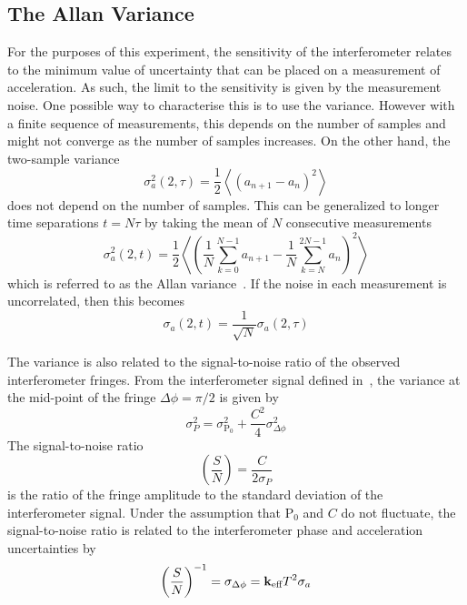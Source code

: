 \subsection{The Allan Variance}\label{subsec:allan_variance}
For the purposes of this experiment, the sensitivity of the
interferometer relates to the minimum value of uncertainty that can be
placed on a measurement of acceleration. As such, the limit to the
sensitivity is given by the measurement noise. One possible way to
characterise this is to use the variance. However with a finite sequence
of measurements, this depends on the number of samples and might not
converge as the number of samples increases. On the other hand, the
two-sample variance 
\begin{equation}
  \sigma_a^2(2,\tau) = \frac{1}{2}\left\langle
  (a_{n+1}-a_n)^2\right\rangle
  \label{eq:two_sample_var}
\end{equation}
does not depend on the number of samples. This can be generalized to
longer time separations \(t = N \tau\) by taking the mean of \(N\)
consecutive measurements
\begin{equation}
  \sigma_a^2(2,t) = \frac{1}{2}
  \left\langle
  \left(\frac{1}{N}\sum_{k=0}^{N-1}a_{n+1}-\frac{1}{N}\sum_{k=N}^{2N-1}a_n\right)^2\right\rangle
  \label{eq:allan_var_mean}
\end{equation}
which is referred to as the Allan variance~\cite{Allan1966}. If the noise in each measurement is uncorrelated, then this becomes
\begin{equation}
\sigma_a(2,t) = \frac{1}{\sqrt{N}}\sigma_a(2,\tau)
\label{eq:allan_var_simp}
\end{equation}
\par\noindent
The variance is also related to the signal-to-noise ratio of the
observed interferometer fringes. From the interferometer signal
defined in~, the variance at the
mid-point of the fringe \(\Delta \phi = \pi/2\) is given by
\begin{equation}
\sigma_P^2 = \sigma_{\text{P}_0}^2 +\frac{C^2}{4}
  \sigma_{\Delta \phi}^2
  \label{eq:var_expansion}
\end{equation}
The signal-to-noise ratio
\begin{equation}
  \left(\frac{S}{N}\right) = \frac{C}{2\sigma_P}
  \label{eq:snr}
\end{equation}
is the ratio of the fringe amplitude to the standard deviation of the
interferometer signal. Under the assumption that \(\text{P}_0\) and
\(C\) do not fluctuate, the signal-to-noise ratio is related to the
interferometer phase and acceleration uncertainties by
\begin{equation}
  \left(\frac{S}{N}\right)^{-1} = \sigma_{\Delta \phi} = {\textbf k_\textnormal{eff}} T^2 \sigma_a
  \label{eq:snr_acc}
\end{equation}

